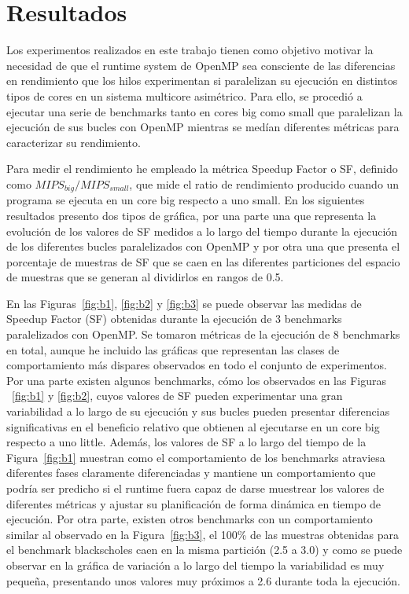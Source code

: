 \section{Resultados}\label{sec:results}

Los experimentos realizados en este trabajo tienen como objetivo motivar la necesidad de que el runtime system de OpenMP sea consciente de las diferencias en rendimiento que los hilos experimentan si paralelizan su ejecución en distintos tipos de cores en un sistema multicore asimétrico. Para ello, se procedió a ejecutar una serie de benchmarks tanto en cores big como small que paralelizan la ejecución de sus bucles con OpenMP mientras se medían diferentes métricas para caracterizar su rendimiento. 

Para medir el rendimiento he empleado la métrica Speedup Factor o SF, definido como ${MIPS}_{big}/{MIPS}_{small}$, que mide el ratio de rendimiento producido cuando un programa se ejecuta en un core big respecto a uno small. En los siguientes resultados presento dos tipos de gráfica, por una parte una que representa la evolución de los valores de SF medidos a lo largo del tiempo durante la ejecución de los diferentes bucles paralelizados con OpenMP y por otra una que presenta el porcentaje de muestras de SF que se caen en las diferentes particiones del espacio de muestras que se generan al dividirlos en rangos de 0.5.

En las Figuras~\ref{fig:b1}, \ref{fig:b2} y \ref{fig:b3} se puede observar las medidas de Speedup Factor (SF) obtenidas durante la ejecución de 3 benchmarks paralelizados con OpenMP. Se tomaron métricas de la ejecución de 8 benchmarks en total, aunque he incluido las gráficas que representan las clases de comportamiento más dispares observados en todo el conjunto de experimentos. Por una parte existen algunos benchmarks, cómo los observados en las Figuras ~\ref{fig:b1} y \ref{fig:b2}, cuyos valores de SF pueden experimentar una gran variabilidad a lo largo de su ejecución y sus bucles pueden presentar diferencias significativas en el beneficio relativo que obtienen al ejecutarse en un core big respecto a uno little. Además, los valores de SF a lo largo del tiempo de la Figura~\ref{fig:b1} muestran como el comportamiento de los benchmarks atraviesa diferentes fases claramente diferenciadas y mantiene un comportamiento que podría ser predicho si el runtime fuera capaz de darse muestrear los valores de diferentes métricas y ajustar su planificación de forma dinámica en tiempo de ejecución. Por otra parte, existen otros benchmarks con un comportamiento similar al observado en la Figura~\ref{fig:b3}, el 100\% de las muestras obtenidas para el benchmark blackscholes caen en la misma partición (2.5 a 3.0) y como se puede observar en la gráfica de variación a lo largo del tiempo la variabilidad es muy pequeña, presentando unos valores muy próximos a 2.6 durante toda la ejecución. 

